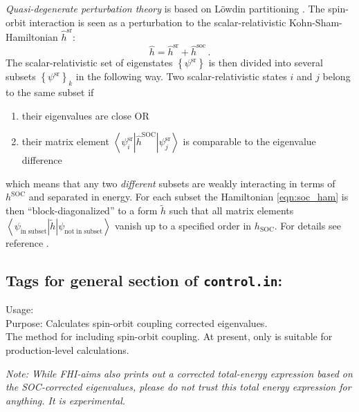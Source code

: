 \emph{Quasi-degenerate perturbation theory} is based on L\"owdin partitioning
\cite{Loewdin51}. The spin-orbit interaction is seen as a perturbation to the 
scalar-relativistic Kohn-Sham-Hamiltonian $\hat{h}^\text{sr}$:
\begin{equation}
\label{eqn:soc_ham}
\hat{h}=\hat{h}^\text{sr}+\hat{h}^\text{soc} \, .
\end{equation}
The scalar-relativistic set of eigenstates $\left\{\psi^\text{sr}\right\}$ is
then divided into several subsets $\left\{\psi^\text{sr}\right\}_k$ in the
following way. Two scalar-relativistic states $i$ and $j$ belong to the same
subset if   
\begin{enumerate}
 \item their eigenvalues are close OR
 \item their matrix element $\left<\psi_i^\text{sr}\left|\hat{h}^\text{SOC}\right|\psi_j^\text{sr}\right>$ 
	is  comparable to the eigenvalue difference
\end{enumerate}
which means that any two \emph{different} subsets are weakly interacting in
terms of $h^\text{SOC}$ and separated in energy. For each subset the
Hamiltonian \ref{eqn:soc_ham} is then 
``block-diagonalized'' to a form $\tilde{h}$ such that all matrix elements 
$\left<\psi_{\mathrm{in\;subset}}\left|\tilde{h}\right|\psi_{\mathrm{not\;in\;subset}}\right>$  
vanish up to a specified order in $h_{\mathrm{SOC}}$. For details see reference
\cite{Winkler:SOC}. 


\newpage

\subsection*{Tags for general section of \texttt{control.in}:}

{
  \noindent
  Usage:   \\[1.0ex]
  Purpose: Calculates spin-orbit coupling corrected eigenvalues. \\[1.0ex] 
   The method for including spin-orbit coupling.  At present, only  
   is suitable for production-level calculations. \\[1.0ex] 
}

\emph{Note: While FHI-aims also prints out a corrected total-energy
  expression based on the SOC-corrected eigenvalues, please do not
  trust this total energy expression for anything. It is experimental.} 


